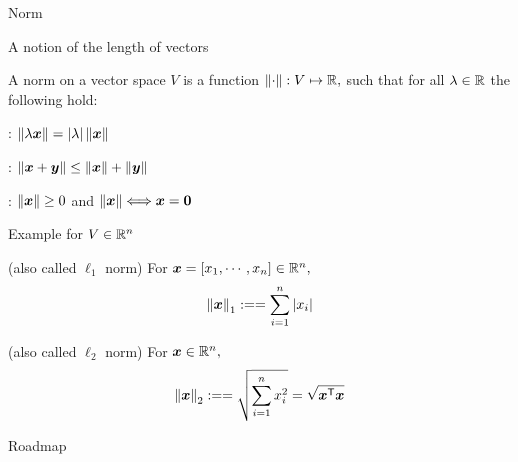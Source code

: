 \documentclass[handout,fleqn,aspectratio=169]{beamer}
\begin{document}
\begin{frame}{Norm}

\plitemsep 0.1in

\bci 
\item A notion of the length of vectors

\item {} A norm on a vector space $V$ is a function $\left \lVert \cdot \right \rVert: V \mapsto {\mathbb R},$ such that for all $\lambda \in {\mathbb R}$ the following hold:

\bci
\item {}: $\left \lVert \lambda \bm{x} \right \rVert = |\lambda| \left \lVert \bm{x} \right \rVert$
\item {}: $\left \lVert \bm{x} + \bm{y} \right \rVert \le \left \lVert \bm{x} \right \rVert + \left \lVert \bm{y} \right \rVert $
\item {}: $\left \lVert \bm{x} \right \rVert \ge 0$ and $\left \lVert \bm{x} \right \rVert \Longleftrightarrow \bm{x} = \bm{0}$
\eci
\eci
\end{frame}

\begin{frame}{Example for $V \in {\mathbb R}^n$}

\plitemsep 0.1in

\bci 
\item {} (also called $\ell_1$ norm) For $\bm{x}= [x_1, \cdots, x_n] \in {\mathbb R}^n,$
$$
\left \lVert \bm{x} \right \rVert_1 := = \sum_{i=1}^n |x_i|
$$
\item {} (also called $\ell_2$ norm) For $\bm{x} \in {\mathbb R}^n,$
$$
\left \lVert \bm{x} \right \rVert_2 := = \sqrt{\sum_{i=1}^n x_i^2} = \sqrt{{\bm{x}}^{\mathsf{T}} \bm{x}}
$$

\eci
\end{frame}


\begin{frame}{Roadmap}

\plitemsep 0.1in

\bce[(1)] 
\item {}

\item {}

\item {}

\ece
\end{frame}
\end{document}
